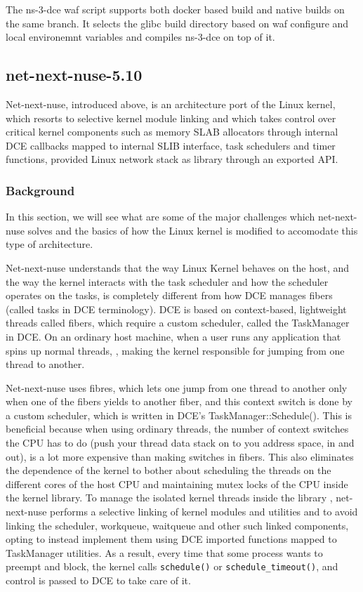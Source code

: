 \documentclass{sig-alternate}
\begin{document}
The ns-3-dce waf script supports both docker based build and native builds on the same branch. It selects the glibc 
build directory based on waf configure and local environemnt variables and compiles ns-3-dce on top of it.


\subsection{net-next-nuse-5.10}
Net-next-nuse, introduced above, is an architecture port of the Linux kernel, which resorts to selective kernel module linking and which takes control over 
critical kernel 
components such as memory SLAB allocators through internal DCE callbacks mapped to internal SLIB interface, 
task schedulers and timer functions, provided Linux network stack as library through an exported API.

\subsubsection{Background}
In this section, we will see what are some of the major challenges which net-next-nuse solves and the basics of how the Linux kernel is modified to 
accomodate this type of architecture.

Net-next-nuse understands that the way Linux Kernel behaves on the host, and the way the kernel interacts with the task 
scheduler and how the scheduler operates on the tasks, is completely different from how DCE manages fibers (called tasks in DCE terminology). 
DCE is based on context-based, lightweight threads called fibers, which require a custom scheduler, called the TaskManager in DCE. On an ordinary
host machine, when a user runs any application that spins up normal threads, , making the kernel responsible for jumping from one thread to another. 

Net-next-nuse uses fibres, which lets one jump from one thread to another only when one of the fibers yields to another fiber, and this context switch 
is done by a custom scheduler, which is written in DCE's TaskManager::Schedule(). This is beneficial because when using ordinary threads, 
the number of context switches the CPU has to do (push your thread data stack on to you address space, in and out), 
is a lot more expensive than making switches in fibers. This also eliminates the dependence of the kernel to bother about scheduling the threads on 
the different cores of the host CPU and maintaining mutex locks of the CPU inside the kernel library. To manage the isolated kernel threads inside the library , 
net-next-nuse  performs  a selective linking of 
kernel modules and utilities and to avoid linking the scheduler, workqueue, waitqueue and other such linked components, opting to instead implement
them using DCE imported functions mapped to TaskManager utilities. As a result, every time that some process wants to preempt and block, the kernel calls 
\texttt{schedule()} or \texttt{schedule\_timeout()}, and control is passed to DCE to take care of it. 
\end{document}

